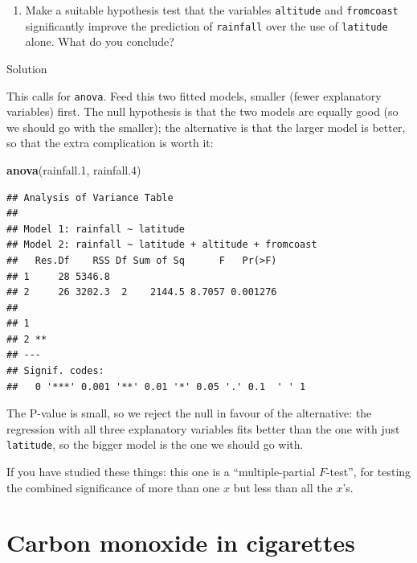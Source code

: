 \documentclass[]{tufte-book}
\newenvironment{Shaded}{}{}
\newcommand{\FloatTok}[1]{\textcolor[rgb]{0.25,0.63,0.44}{#1}}
\newcommand{\KeywordTok}[1]{\textcolor[rgb]{0.00,0.44,0.13}{\textbf{#1}}}
\newcommand{\NormalTok}[1]{#1}
\providecommand{\tightlist}{%
  \setlength{\itemsep}{0pt}\setlength{\parskip}{0pt}}
\theoremstyle{definition}
\theoremstyle{definition}
\theoremstyle{definition}
\theoremstyle{remark}
\begin{document}
\begin{enumerate}
\def\labelenumi{(\roman{enumi})}
\tightlist
\item
  Make a suitable hypothesis test that the variables \texttt{altitude}
  and \texttt{fromcoast} significantly improve the prediction of
  \texttt{rainfall} over the use of \texttt{latitude} alone. What do you
  conclude?
\end{enumerate}

Solution

This calls for \texttt{anova}. Feed this two fitted models, smaller
(fewer explanatory variables) first. The null hypothesis is that the two
models are equally good (so we should go with the smaller); the
alternative is that the larger model is better, so that the extra
complication is worth it:

\begin{Shaded}
\begin{Highlighting}[]
\KeywordTok{anova}\NormalTok{(rainfall}\FloatTok{.1}\NormalTok{, rainfall}\FloatTok{.4}\NormalTok{)}
\end{Highlighting}
\end{Shaded}

\begin{verbatim}
## Analysis of Variance Table
## 
## Model 1: rainfall ~ latitude
## Model 2: rainfall ~ latitude + altitude + fromcoast
##   Res.Df    RSS Df Sum of Sq      F   Pr(>F)
## 1     28 5346.8                             
## 2     26 3202.3  2    2144.5 8.7057 0.001276
##     
## 1   
## 2 **
## ---
## Signif. codes:  
##   0 '***' 0.001 '**' 0.01 '*' 0.05 '.' 0.1  ' ' 1
\end{verbatim}

The P-value is small, so we reject the null in favour of the
alternative: the regression with all three explanatory variables fits
better than the one with just \texttt{latitude}, so the bigger model is
the one we should go with.

If you have studied these things: this one is a ``multiple-partial
\(F\)-test'', for testing the combined significance of more than one
\(x\) but less than all the \(x\)'s.

\hypertarget{carbon-monoxide-in-cigarettes}{%
\section{Carbon monoxide in
cigarettes}\label{carbon-monoxide-in-cigarettes}}
\end{document}
